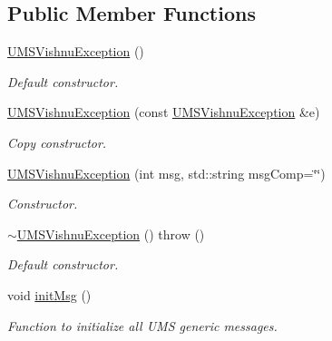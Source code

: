 \subsection*{Public Member Functions}
\begin{DoxyCompactItemize}
\item 
\hypertarget{classUMSVishnuException_aa71e0473dd7f135fec1d3bb796d249d4}{
\hyperlink{classUMSVishnuException_aa71e0473dd7f135fec1d3bb796d249d4}{UMSVishnuException} ()}
\label{classUMSVishnuException_aa71e0473dd7f135fec1d3bb796d249d4}

\begin{DoxyCompactList}\small\item\em Default constructor. \item\end{DoxyCompactList}\item 
\hyperlink{classUMSVishnuException_a48f85c69d5a01d11f4c23bb54e4f37ae}{UMSVishnuException} (const \hyperlink{classUMSVishnuException}{UMSVishnuException} \&e)
\begin{DoxyCompactList}\small\item\em Copy constructor. \item\end{DoxyCompactList}\item 
\hyperlink{classUMSVishnuException_a697fa89ae49d59ad1fb789ff7b780c96}{UMSVishnuException} (int msg, std::string msgComp=\char`\"{}\char`\"{})
\begin{DoxyCompactList}\small\item\em Constructor. \item\end{DoxyCompactList}\item 
\hypertarget{classUMSVishnuException_a12d672982e0cedb3fe77dac2e449e837}{
\hyperlink{classUMSVishnuException_a12d672982e0cedb3fe77dac2e449e837}{$\sim$UMSVishnuException} ()  throw ()}
\label{classUMSVishnuException_a12d672982e0cedb3fe77dac2e449e837}

\begin{DoxyCompactList}\small\item\em Default constructor. \item\end{DoxyCompactList}\item 
\hypertarget{classUMSVishnuException_a6f684da55cc4be6c4c9158e8562709e0}{
void \hyperlink{classUMSVishnuException_a6f684da55cc4be6c4c9158e8562709e0}{initMsg} ()}
\label{classUMSVishnuException_a6f684da55cc4be6c4c9158e8562709e0}

\begin{DoxyCompactList}\small\item\em Function to initialize all UMS generic messages. \item\end{DoxyCompactList}\end{DoxyCompactItemize}


